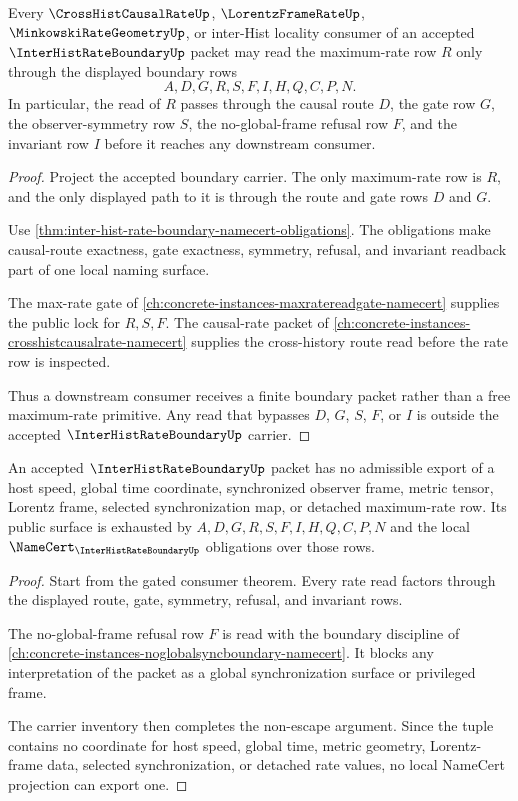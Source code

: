 \begin{theorem}
\label{thm:inter-hist-rate-boundary-gated-consumer}
Every $\CrossHistCausalRateUp$, $\LorentzFrameRateUp$, $\MinkowskiRateGeometryUp$, or inter-Hist locality consumer of an accepted $\InterHistRateBoundaryUp$ packet may read the maximum-rate row $R$ only through the displayed boundary rows
$$
A,D,G,R,S,F,I,H,Q,C,P,N.
$$
In particular, the read of $R$ passes through the causal route $D$, the gate row $G$, the observer-symmetry row $S$, the no-global-frame refusal row $F$, and the invariant row $I$ before it reaches any downstream consumer.
\end{theorem}
\begin{proof}
Project the accepted boundary carrier. The only maximum-rate row is $R$, and the only displayed path to it is through the route and gate rows $D$ and $G$.

Use \autoref{thm:inter-hist-rate-boundary-namecert-obligations}. The obligations make causal-route exactness, gate exactness, symmetry, refusal, and invariant readback part of one local naming surface.

The max-rate gate of \autoref{ch:concrete-instances-maxratereadgate-namecert} supplies the public lock for $R,S,F$. The causal-rate packet of \autoref{ch:concrete-instances-crosshistcausalrate-namecert} supplies the cross-history route read before the rate row is inspected.

Thus a downstream consumer receives a finite boundary packet rather than a free maximum-rate primitive. Any read that bypasses $D$, $G$, $S$, $F$, or $I$ is outside the accepted $\InterHistRateBoundaryUp$ carrier.
\end{proof}

\begin{theorem}
\label{thm:inter-hist-rate-boundary-nonescape}
An accepted $\InterHistRateBoundaryUp$ packet has no admissible export of a host speed, global time coordinate, synchronized observer frame, metric tensor, Lorentz frame, selected synchronization map, or detached maximum-rate row. Its public surface is exhausted by $A,D,G,R,S,F,I,H,Q,C,P,N$ and the local $\NameCert_{\InterHistRateBoundaryUp}$ obligations over those rows.
\end{theorem}
\begin{proof}
Start from the gated consumer theorem. Every rate read factors through the displayed route, gate, symmetry, refusal, and invariant rows.

The no-global-frame refusal row $F$ is read with the boundary discipline of \autoref{ch:concrete-instances-noglobalsyncboundary-namecert}. It blocks any interpretation of the packet as a global synchronization surface or privileged frame.

The carrier inventory then completes the non-escape argument. Since the tuple contains no coordinate for host speed, global time, metric geometry, Lorentz-frame data, selected synchronization, or detached rate values, no local NameCert projection can export one.
\end{proof}

